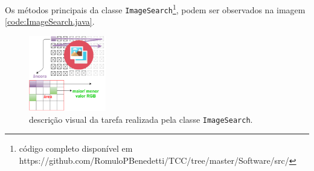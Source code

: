 \documentclass[tg]{mdtufsm}
\begin{document}
                Os métodos principais da classe \texttt{ImageSearch}\footnote{código completo disponível em https://github.com/RomuloPBenedetti/TCC/tree/master/Software/src/}, podem ser observados na imagem \ref{code:ImageSearch.java}.

                \begin{figure}[!htb]
                    {\centering
                    \includegraphics[width=0.3\textwidth]{imagens/searchImage.png}
                    \caption{descrição visual da tarefa realizada pela classe \texttt{ImageSearch}.}
                    \label{fig:ImageSearch}}
                \end{figure}
\end{document}
